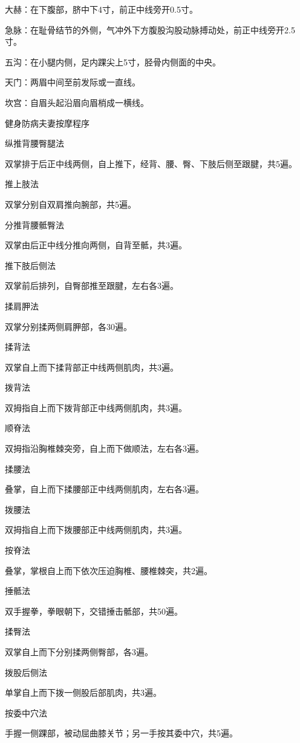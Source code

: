 \documentclass[12pt,UTF8]{ctexbook}
\begin{document}
大赫：在下腹部，脐中下4寸，前正中线旁开0.5寸。

急脉：在耻骨结节的外侧，气冲外下方腹股沟股动脉搏动处，前正中线旁开2.5寸。

五沟：在小腿内侧，足内踝尖上5寸，胫骨内侧面的中央。

天门：两眉中间至前发际或一直线。

坎宫：自眉头起沿眉向眉梢成一横线。





健身防病夫妻按摩程序


纵推背腰臀腿法

双掌排于后正中线两侧，自上推下，经背、腰、臀、下肢后侧至跟腱，共5遍。

推上肢法

双掌分别自双肩推向腕部，共5遍。

分推背腰骶臀法

双掌由后正中线分推向两侧，自背至骶，共3遍。

推下肢后侧法

双掌前后排列，自臀部推至跟腱，左右各3遍。

揉肩胛法

双掌分别揉两侧肩胛部，各30遍。

揉背法

双掌自上而下揉背部正中线两侧肌肉，共3遍。

拨背法

双拇指自上而下拨背部正中线两侧肌肉，共3遍。

顺脊法

双拇指沿胸椎棘突旁，自上而下做顺法，左右各3遍。

揉腰法

叠掌，自上而下揉腰部正中线两侧肌肉，左右各3遍。

拨腰法

双拇指自上而下拨腰部正中线两侧肌肉，共3遍。

按脊法

叠掌，掌根自上而下依次压迫胸椎、腰椎棘突，共2遍。

捶骶法

双手握拳，拳眼朝下，交错捶击骶部，共50遍。

揉臀法

双掌自上而下分别揉两侧臀部，各3遍。

拨股后侧法

单掌自上而下拨一侧股后部肌肉，共3遍。

按委中穴法

手握一侧踝部，被动屈曲膝关节；另一手按其委中穴，共5遍。
\end{document}
